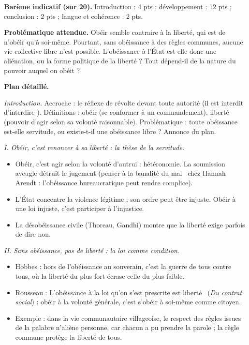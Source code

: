 \documentclass[11pt]{article}
\begin{document}
\begin{corrige}

\textbf{Barème indicatif (sur 20).} Introduction : 4 pts ; développement : 12 pts ; conclusion : 2 pts ; langue et cohérence : 2 pts.

\textbf{Problématique attendue.} Obéir semble contraire à la liberté, qui est de n'obéir qu'à soi-même. Pourtant, sans obéissance à des règles communes, aucune vie collective libre n'est possible. L'obéissance à l'État est-elle donc une aliénation, ou la forme politique de la liberté ? Tout dépend-il de la nature du pouvoir auquel on obéit ?

\textbf{Plan détaillé.}

\emph{Introduction.} Accroche : le réflexe de révolte devant toute autorité (\guillemotleft il est interdit d'interdire \guillemotright). Définitions : obéir (se conformer à un commandement), liberté (pouvoir d'agir selon sa volonté raisonnable). Problématique : toute obéissance est-elle servitude, ou existe-t-il une obéissance libre ? Annonce du plan.

\emph{I. Obéir, c'est renoncer à sa liberté : la thèse de la servitude.}
\begin{itemize}
\item Obéir, c'est agir selon la volonté d'autrui : hétéronomie. La soumission aveugle détruit le jugement (penser à la \guillemotleft banalité du mal \guillemotright\ chez Hannah Arendt : l'obéissance bureaucratique peut rendre complice).
\item L'État concentre la violence légitime ; son ordre peut être injuste. Obéir à une loi injuste, c'est participer à l'injustice.
\item La désobéissance civile (Thoreau, Gandhi) montre que la liberté exige parfois de dire non.
\end{itemize}

\emph{II. Sans obéissance, pas de liberté : la loi comme condition.}
\begin{itemize}
\item Hobbes : hors de l'obéissance au souverain, c'est la guerre de tous contre tous, où la liberté du plus fort écrase celle du plus faible.
\item Rousseau : \guillemotleft L'obéissance à la loi qu'on s'est prescrite est liberté \guillemotright\ (\emph{Du contrat social}) : obéir à la volonté générale, c'est s'obéir à soi-même comme citoyen.
\item Exemple : dans la vie communautaire villageoise, le respect des règles issues de la palabre n'aliène personne, car chacun a pu prendre la parole ; la règle commune protège la liberté de tous.
\end{itemize}


\end{corrige}
\end{document}
